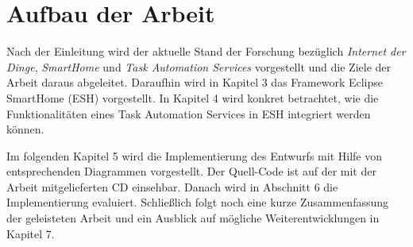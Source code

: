 \section{Aufbau der Arbeit}
Nach der Einleitung wird der aktuelle Stand der Forschung bezüglich \textit{Internet der Dinge}, \textit{SmartHome} und \textit{Task Automation Services} vorgestellt und die Ziele der Arbeit daraus abgeleitet. Daraufhin wird in Kapitel 3 das Framework Eclipse SmartHome (ESH) vorgestellt. In Kapitel 4 wird konkret betrachtet, wie die Funktionalitäten eines Task Automation Services in ESH integriert werden können.

Im folgenden Kapitel 5 wird die Implementierung des Entwurfs mit Hilfe von entsprechenden
Diagrammen vorgestellt. Der Quell-Code ist auf der mit der Arbeit mitgelieferten
CD einsehbar. Danach wird in Abschnitt 6 die Implementierung evaluiert. Schließlich folgt
noch eine kurze Zusammenfassung der geleisteten Arbeit und ein Ausblick auf mögliche
Weiterentwicklungen in Kapitel 7.

